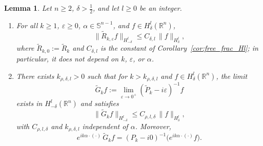 \documentclass[12pt,a4paper]{amsart}
\numberwithin{equation}{section}
\theoremstyle{plain}
\newtheorem{lemma}[theorem]{Lemma}
\theoremstyle{definition}
\begin{document}
\begin{lemma}\label{lem:conj_resolvent}
Let $n\geq2$, $\delta>\frac12$, and let $l\geq0$ be an integer.
\begin{enumerate}
\item[(i)] For all $k\geq1$, $\varepsilon\geq0$, $\alpha\in\mathbb{S}^{n-1}$,
and $f\in H^l_\delta(\mathbb{R}^n)$,
\begin{equation}\label{eq:conj_Hl_est}
\|\widetilde{R}_{k,\varepsilon}f\|_{H^l_{-\delta}}
\leq C_{\delta,l}\,\|f\|_{H^l_\delta},
\end{equation}
where $\widetilde{R}_{k,0}:=\widetilde{R}_k$ and $C_{\delta,l}$ is the
constant of Corollary~\ref{cor:free_frac_Hl}; in particular, it does not
depend on $k$, $\varepsilon$, or $\alpha$.
\item[(ii)] There exists $k_{\rho,\delta,l}>0$ such that for
$k>k_{\rho,\delta,l}$ and $f\in H^l_\delta(\mathbb{R}^n)$, the limit
\begin{equation*}
\widetilde{G}_k f := \lim_{\varepsilon\to0^+}(\widetilde{P}_k - i\varepsilon)^{-1}f
\end{equation*}
exists in $H^l_{-\delta}(\mathbb{R}^n)$ and satisfies
\begin{equation}\label{eq:conj_LAP_est}
\|\widetilde{G}_k f\|_{H^l_{-\delta}} \leq C_{\rho,l,\delta}\,\|f\|_{H^l_\delta},
\end{equation}
with $C_{\rho,l,\delta}$ and $k_{\rho,\delta,l}$ independent of $\alpha$. Moreover,
\begin{equation}\label{eq:conj_LAP_identity}
e^{ik\alpha\cdot(\cdot)}\,\widetilde{G}_k f
= (P_k - i0)^{-1}\bigl(e^{ik\alpha\cdot(\cdot)}f\bigr).
\end{equation}
\end{enumerate}
\end{lemma}
\end{document}
